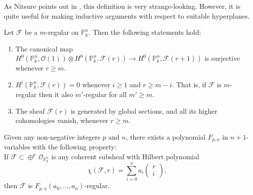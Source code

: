 \documentclass[ignorenonframetext,t]{beamer}
\newcommand{\sF}{{\mathcal F}}
\newcommand{\sO}{{\mathcal O}}
\renewcommand{\P}{{\mathbb P}}
\theoremstyle{definition}
\begin{document}
As Nitsure points out in \cite{FGAExplained}, this definition is very strange-looking. However, it is quite useful for making inductive arguments with respect to suitable hyperplanes.


\begin{lemma}[Castelnuovo]
	Let $\sF$ be a $m$-regular on $\P^n_k$. Then the following statements hold:
	\begin{enumerate}
		\item The canonical map $H^0(\P^n_k,\sO(1)) \otimes H^0(\P^n_k,\sF(r)) \rightarrow H^0(\P^n_k,\sF(r+1))$ is surjective whenever $r\geq m$.
		\item $H^i(\P^n_k,\sF(r))=0$ whenever $i\geq 1$ and $r\geq m-i$. That is, if $\sF$ is $m$-regular then it also $m'$-regular for all $m'\geq m$.
		\item The sheaf $\sF(r)$ is generated by global sections, and all its higher cohomologies vanish, whenever $r\geq m$.
	\end{enumerate}
\end{lemma}

\begin{frame}
\begin{theorem}[Mumford]
	Given any non-negative integers $p$ and $n$, there exists a polynomial $F_{p,n}$ in $n+1$-variables with the following property:\\
	If $\sF\subset \oplus^p\, \sO_{\P^n_k}$ is any coherent subsheaf  with Hilbert polynomial 
	\[\chi(\sF,r)=\overset{n}{\underset{i=0}{\sum}} a_i 
	\begin{pmatrix}
	r\\
	i	
	\end{pmatrix},\]
	then $\sF$ is $F_{p,n}(a_0,\ldots,a_n)$-regular.
\end{theorem}
\end{frame}
\end{document}
